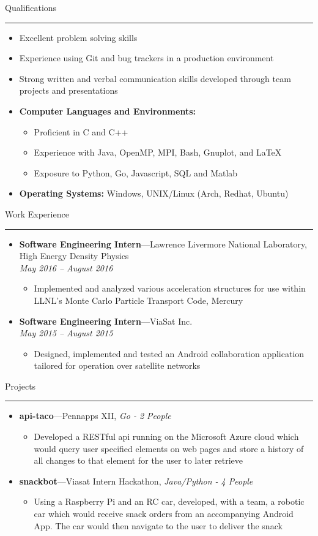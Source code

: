 \documentclass[10pt,oneside]{article}
\newcommand{\sectitle}[1]{
	\begin{flushleft}{\fontfamily{phv}\selectfont\Large#1}\end{flushleft}
}
\newenvironment{ressection}[1]{
	\vspace{2pt}
	\sectitle{#1}
	\vspace{-10pt}\rule{\textwidth}{0.5pt}
	\vspace{-10pt}
	\begin{itemize}
	\vspace{3pt}
}{
	\end{itemize}
}
\newcommand{\resitem}[1]{
	\vspace{-4pt}
	\item \begin{flushleft} #1 \end{flushleft}
}
\newcommand{\ressubitem}[1]{
	\vspace{-1pt}
	\item \begin{flushleft} #1 \end{flushleft}
}
\newcommand{\resbigitemline}[3]{
	\vspace{-5pt}
	\item
	\textbf{#1}---#2, 
	\textit{#3}
}
\newcommand{\resbigitem}[3]{
	\vspace{-5pt}
	\item
	\textbf{#1}---#2 \\
	\textit{#3}
}
\newenvironment{ressubsec}[3]{
	\resbigitem{#1}{#2}{#3}
	\vspace{-2pt}
	\begin{itemize}
}{
	\end{itemize}
}
\newenvironment{ressubsecline}[3]{
	\resbigitemline{#1}{#2}{#3}
	\vspace{-2pt}
	\begin{itemize}
}{
	\end{itemize}
}
\newenvironment{reslist}[1]{
	\resitem{\textbf{#1}}
	\vspace{-5pt}
	\begin{itemize}
}{
	\end{itemize}
}
\begin{document}
\begin{ressection}{Qualifications}
	\resitem{Excellent problem solving skills}

	\resitem{Experience using Git and bug trackers in a production environment}

	\resitem{Strong written and verbal communication skills developed through team projects and presentations}

	\begin{reslist}{Computer Languages and Environments:}
		\ressubitem{Proficient in C and C++}
		\ressubitem{Experience with Java, OpenMP, MPI, Bash, Gnuplot, and LaTeX}
		\ressubitem{Exposure to Python, Go, Javascript, SQL and Matlab}
	\end{reslist}

	\resitem{\textbf{Operating Systems:} Windows,
	UNIX/Linux (Arch, Redhat, Ubuntu)}

\end{ressection}


\begin{ressection}{Work Experience}
	\begin{ressubsec}{Software Engineering Intern}{Lawrence Livermore National Laboratory, High Energy Density Physics}{May 2016 -- August 2016}
    \ressubitem{Implemented and analyzed various acceleration structures for use within LLNL's Monte Carlo Particle Transport Code, Mercury}
  \end{ressubsec}
	
  \begin{ressubsec}{Software Engineering Intern}{ViaSat Inc.}{May 2015 -- August 2015}
    \ressubitem{Designed, implemented and tested an Android collaboration application tailored for operation over satellite networks}
  \end{ressubsec}

\end{ressection}

\begin{ressection}{Projects}
	\begin{ressubsecline}{api-taco}{Pennapps XII}{Go - 2 People}
		\ressubitem{Developed a RESTful api running on the Microsoft Azure cloud which would query user specified
		elements on web pages and store a history of all changes to that element for the user to later retrieve}
	\end{ressubsecline}
	\begin{ressubsecline}{snackbot}{Viasat Intern Hackathon}{Java/Python - 4 People}
		\ressubitem{Using a Raspberry Pi and an RC car, developed, with a team, a robotic car which would receive snack
		orders from an accompanying Android App. The car would then navigate to the user to deliver the snack}
	\end{ressubsecline}
\end{ressection}
\end{document}
